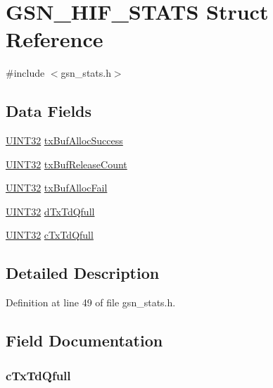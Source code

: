 \hypertarget{a00092}{
\section{GSN\_\-HIF\_\-STATS Struct Reference}
\label{a00092}
}


{\ttfamily \#include $<$gsn\_\-stats.h$>$}

\subsection*{Data Fields}
\begin{DoxyCompactItemize}
\item 
\hyperlink{a00660_gae1e6edbbc26d6fbc71a90190d0266018}{UINT32} \hyperlink{a00092_a874a9f6cb0895f20925b1a1eb7cf2ed4}{txBufAllocSuccess}
\item 
\hyperlink{a00660_gae1e6edbbc26d6fbc71a90190d0266018}{UINT32} \hyperlink{a00092_a2154526c3fd63ceabf76e7a66af6756b}{txBufReleaseCount}
\item 
\hyperlink{a00660_gae1e6edbbc26d6fbc71a90190d0266018}{UINT32} \hyperlink{a00092_aef1a78db1439dd9f28bf25ce00f8634e}{txBufAllocFail}
\item 
\hyperlink{a00660_gae1e6edbbc26d6fbc71a90190d0266018}{UINT32} \hyperlink{a00092_a7d2ac350a2e3c596fbfb525a4f039285}{dTxTdQfull}
\item 
\hyperlink{a00660_gae1e6edbbc26d6fbc71a90190d0266018}{UINT32} \hyperlink{a00092_a38bd3cdfd8582e32e72af800095a4170}{cTxTdQfull}
\end{DoxyCompactItemize}


\subsection{Detailed Description}


Definition at line 49 of file gsn\_\-stats.h.



\subsection{Field Documentation}
\hypertarget{a00092_a38bd3cdfd8582e32e72af800095a4170}{
\subsubsection[{cTxTdQfull}]{ {\bf cTxTdQfull}}}
\label{a00092_a38bd3cdfd8582e32e72af800095a4170}


